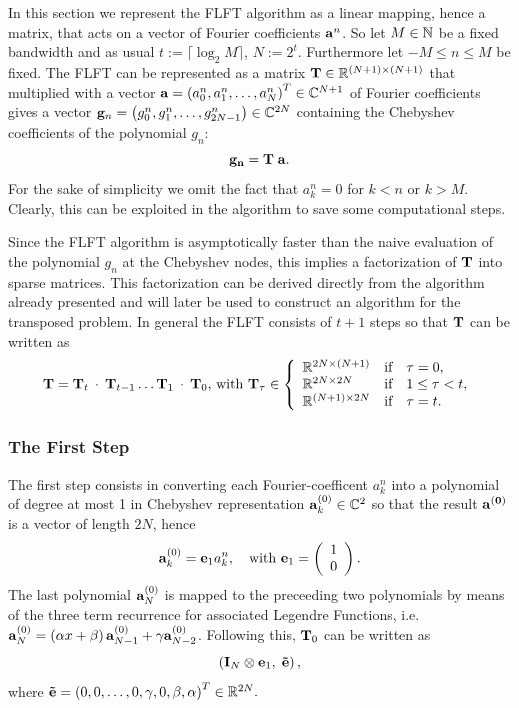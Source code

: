 In this section we represent the FLFT algorithm as a linear mapping, hence a matrix, that acts on a vector of Fourier coefficients $\mathbf{a}^n$. So let $M \in \mathbb{N}$ be a fixed bandwidth and as usual $t := \lceil\log_2{M}\rceil$, $N := 2^t$. Furthermore let  $-M \le n \le M$ be fixed. The FLFT can be represented as a matrix $\mathbf{T} \in \mathbb{R}^{(N+1) \times (N+1)}$ that multiplied with a vector $\mathbf{a} = \left(a_0^n,a_1^n,\dots,a_N^n\right)^T \in \mathbb{C}^{N+1}$ of Fourier coefficients gives a vector $\mathbf{g}_n = \left(g_0^n,g_1^n,\dots,g_{2N-1}^n\right) \in \mathbb{C}^{2N}$ containing the Chebyshev coefficients of the polynomial $g_n$: $$\mathbf{g_{n}} = \mathbf{T} \; \mathbf{a}.$$ For the sake of simplicity we omit the fact that $a_{k}^n = 0$ for $k < n$ or $k > M$. Clearly, this can be exploited in the algorithm to save some computational steps.

Since the FLFT algorithm is asymptotically faster than the naive evaluation of the polynomial $g_{n}$ at the Chebyshev nodes, this implies a factorization of $\mathbf{T}$ into sparse matrices. This factorization can be derived directly from the algorithm already presented and will later be used to construct an algorithm for the transposed problem. In general the FLFT consists of $t+1$ steps so that $\mathbf{T}$ can be written as $$\mb{T} = \mb{T}_{t} \: \cdot \:  \mb{T}_{t-1} \dots \mb{T}_{1} \: \cdot \:  \mb{T}_{0} \text{, with } \mb{T}_{\tau} \in \left\{\begin{array}{l@{\quad \text{if} \quad}l} \R^{2N \times (N+1)} & \tau = 0, \\ \R^{2N \times 2N} & 1 \le \tau < t, \\ \R^{(N+1) \times 2N} & \tau = t. \end{array}\right.$$

\subsubsection{The First Step}

The first step consists in converting each Fourier-coefficent $a_{k}^n$ into a polynomial of degree at most 1 in Chebyshev representation $\mathbf{a}_{k}^{(0)} \in \mathbb{C}^2$ so that the result $\mathbf{a^{(0)}}$ is a vector of length $2N$, hence $$ \mathbf{a}_{k}^{(0)} = \mathbf{e}_{1} a_{k}^n,\quad \text{with } \mathbf{e}_{1} = \left(\begin{array}{l}1\\0\end{array}\right).$$
The last polynomial $\mathbf{a}_{N}^{(0)}$ is mapped to the preceeding two polynomials by means of the three term recurrence for associated Legendre Functions, i.e. $\mathbf{a}_{N}^{(0)} = \left(\alpha x + \beta\right)\mathbf{a}_{N-1}^{(0)} + \gamma \mathbf{a}_{N-2}^{(0)}$. Following this, $\mathbf{T}_{0}$ can be written as
$$\left(\mathbf{I}_{N} \otimes \mathbf{e}_{1},\;\mathbf{\tilde{e}}\right),$$ 
where $\mathbf{\tilde{e}} = \left(0,0,\dots,0,\gamma, 0, \beta,\alpha\right)^T \in \mathbb{R}^{2N}.$

